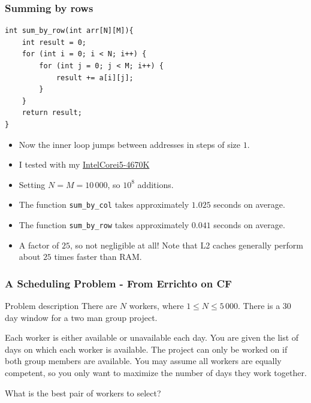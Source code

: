 \documentclass[11pt]{beamer}
\begin{document}
\begin{frame}
    \frametitle{Summing by rows}
    \begin{scriptsize}
        \begin{verbatim}
int sum_by_row(int arr[N][M]){
    int result = 0;
    for (int i = 0; i < N; i++) {
        for (int j = 0; j < M; i++) {
            result += a[i][j];
        }
    }
    return result;
}
        \end{verbatim}
    \end{scriptsize}
    \begin{itemize}
        \item<1-> Now the inner loop jumps between addresses in steps of size $1$. 
        \item<2-> I tested with my \href{https://www.intel.com/content/www/us/en/products/sku/75048/intel-core-i54670k-processor-6m-cache-up-to-3-80-ghz/specifications.html}{Intel\textregistered Core\texttrademark i5-4670K}
        \item<3-> Setting $N = M = 10\,000$, so $10^8$ additions.
        \item<4-> The function \texttt{sum\_by\_col} takes approximately $1.025$ seconds on average.
        \item<5-> The function \texttt{sum\_by\_row} takes approximately $0.041$ seconds on average.
        \item<6-> A factor of $25$, so not negligible at all! Note that L2 caches generally perform about $25$ times faster than RAM.
    \end{itemize}
\end{frame}

\begin{frame}[plain]
	\frametitle{A Scheduling Problem - From Errichto on CF}
	\begin{block}{Problem description}
        There are $N$ workers, where $1 \leq N \leq 5\,000$.
        There is a $30$ day window for a two man group project.

        Each worker is either available or unavailable each day.
        You are given the list of days on which each worker is available.
        The project can only be worked on if both group members are available.
        You may assume all workers are equally competent, so you only want to maximize the number of days they work together.

        What is the best pair of workers to select?
    \end{block}
\end{frame}
\end{document}
